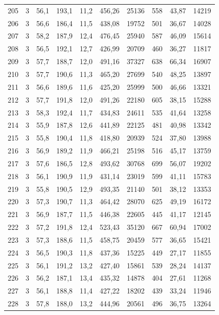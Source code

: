 \documentclass[11pt,a4paper]{article}
\begin{document}
{\begin{longtable}{r c r r r r r r r r}
205 & 3 & 56,1 & 193,1 & 11,2 & 456,26 & 25136 & 558 & 43,87 & 14219 \\
206 & 3 & 56,6 & 186,4 & 11,5 & 438,08 & 19752 & 501 & 36,67 & 14028 \\
207 & 3 & 58,2 & 187,9 & 12,4 & 476,45 & 25940 & 587 & 46,09 & 15614 \\
208 & 3 & 56,5 & 192,1 & 12,7 & 426,99 & 20709 & 460 & 36,27 & 11817 \\
209 & 3 & 57,7 & 188,7 & 12,0 & 491,16 & 37327 & 638 & 66,34 & 16907 \\
210 & 3 & 57,7 & 190,6 & 11,3 & 465,20 & 27699 & 540 & 48,25 & 13897 \\
211 & 3 & 56,6 & 189,6 & 11,6 & 425,20 & 25999 & 500 & 46,66 & 13321 \\
212 & 3 & 57,7 & 191,8 & 12,0 & 491,26 & 22180 & 605 & 38,15 & 15288 \\
213 & 3 & 58,3 & 192,4 & 11,7 & 434,83 & 24611 & 535 & 41,64 & 13258 \\
214 & 3 & 55,9 & 187,8 & 12,6 & 441,89 & 22125 & 481 & 40,98 & 13342 \\
215 & 3 & 55,8 & 190,4 & 11,8 & 418,80 & 20939 & 524 & 37,80 & 13988 \\
216 & 3 & 56,9 & 189,2 & 11,9 & 466,21 & 25198 & 516 & 45,17 & 13759 \\
217 & 3 & 57,6 & 186,5 & 12,8 & 493,62 & 30768 & 699 & 56,07 & 19202 \\
218 & 3 & 56,1 & 190,9 & 11,9 & 431,14 & 23019 & 599 & 41,11 & 15783 \\
219 & 3 & 55,8 & 190,5 & 12,9 & 493,35 & 21140 & 501 & 38,12 & 13353 \\
220 & 3 & 57,3 & 190,7 & 11,3 & 464,42 & 28070 & 625 & 49,19 & 16172 \\
221 & 3 & 56,9 & 187,7 & 11,5 & 446,38 & 22605 & 445 & 41,17 & 12145 \\
222 & 3 & 57,2 & 191,8 & 12,4 & 523,43 & 35120 & 667 & 60,94 & 17002 \\
223 & 3 & 57,3 & 188,6 & 11,5 & 458,75 & 20459 & 577 & 36,65 & 15421 \\
224 & 3 & 56,5 & 190,3 & 11,8 & 437,36 & 15225 & 449 & 27,17 & 11855 \\
225 & 3 & 56,1 & 191,2 & 13,2 & 427,40 & 15861 & 539 & 28,24 & 14137 \\
226 & 3 & 56,2 & 187,1 & 13,4 & 435,32 & 14878 & 404 & 27,61 & 11268 \\
227 & 3 & 56,1 & 188,8 & 11,4 & 427,22 & 18202 & 439 & 33,24 & 11946 \\
228 & 3 & 57,8 & 188,0 & 13,2 & 444,96 & 20561 & 496 & 36,75 & 13264 \\

\end{longtable}}
\end{document}
